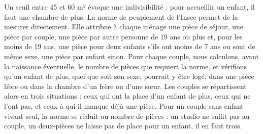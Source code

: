 \documentclass[11pt,a4paper]{article}
\theoremstyle{plain}
\theoremstyle{definition}
\theoremstyle{remark}
\begin{document}
Un seuil entre 45 et 60 m² évoque une indivisibilité : pour accueillir un enfant, il faut une chambre de plus. La norme de peuplement de l'Insee permet de la mesurer directement. Elle attribue à chaque ménage une pièce de séjour, une pièce par couple, une pièce par autre personne de 19 ans ou plus et, pour les moins de 19 ans, une pièce pour deux enfants s'ils ont moins de 7 ans ou sont de même sexe, une pièce par enfant sinon. Pour chaque couple, nous calculons, avant la naissance éventuelle, le nombre de pièces que requiert la norme, et vérifions qu'un enfant de plus, quel que soit son sexe, pourrait y être logé, dans une pièce libre ou dans la chambre d'un frère ou d'une sœur. Les couples se répartissent alors en trois situations : ceux qui ont la place d'un enfant de plus, ceux qui ne l'ont pas, et ceux à qui il manque déjà une pièce. Pour un couple sans enfant vivant seul, la norme se réduit au nombre de pièces : un studio ne suffit pas au couple, un deux-pièces ne laisse pas de place pour un enfant, il en faut trois.
\end{document}
